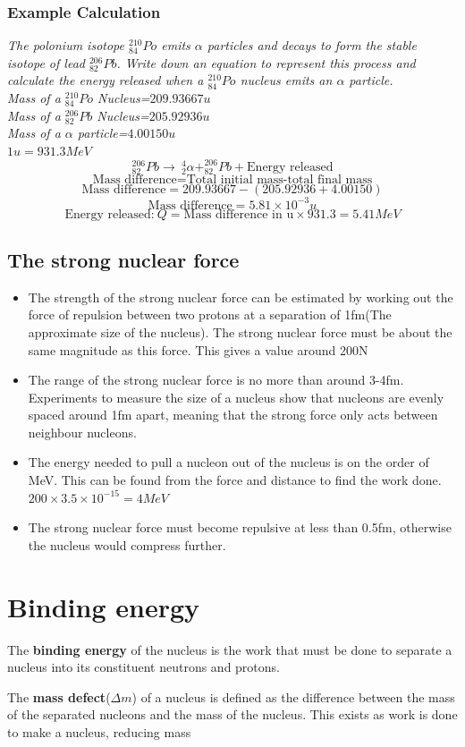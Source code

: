 \documentclass{article}[18pt]
\begin{document}
\subsubsection{Example Calculation}
\textit{The polonium isotope $^{210}_{84}Po$ emits $\alpha$ particles and decays to form the stable isotope of lead $^{206}_{82}Pb$. Write down an equation to represent this process and calculate the energy released when a $^{210}_{84}Po$ nucleus emits an $\alpha$ particle.\\
Mass of a $^{210}_{84}Po$ Nucleus=$209.93667u$\\
Mass of a $^{206}_{82}Pb$ Nucleus=$205.92936u$\\
Mass of a $\alpha$ particle=$4.00150u$\\
$1u=931.3MeV$}\\
$$^{206}_{82}Pb\rightarrow \ ^4_2\alpha+^{206}_{82}Pb+\textrm{Energy released}$$
$$\textrm{Mass difference}=\textrm{Total initial mass-total final mass}$$
$$\textrm{Mass difference}=209.93667-(205.92936+4.00150)$$
$$\textrm{Mass difference}=5.81\times10^{-3}u$$
$$\textrm{Energy released:}\ Q=\textrm{Mass difference in u}\times931.3=5.41MeV$$
\subsection{The strong nuclear force}
\begin{itemize}
\item The strength of the strong nuclear force can be estimated by working out the force of repulsion between two protons at a separation of 1fm(The approximate size of the nucleus). The strong nuclear force must be about the same magnitude as this force. This gives a value around 200N
\item The range of the strong nuclear force is no more than around 3-4fm. Experiments to measure the size of a nucleus show that nucleons are evenly spaced around 1fm apart, meaning that the strong force only acts between neighbour nucleons.
\item The energy needed to pull a nucleon out of the nucleus is on the order of MeV. This can be found from the force and distance to find the work done. $200\times3.5\times10^{-15}=4MeV$
\item The strong nuclear force must become repulsive at less than 0.5fm, otherwise the nucleus would compress further.
\end{itemize}
\newpage
\section{Binding energy}
\begin{center}
The \textbf{binding energy} of the nucleus is the work that must be done to separate a nucleus into its constituent neutrons and protons.
\end{center}
\begin{center}
The \textbf{mass defect}($\Delta m$) of a nucleus is defined as the difference between the mass of the separated nucleons and the mass of the nucleus. This exists as work is done to make a nucleus, reducing mass
\end{center}
\end{document}

